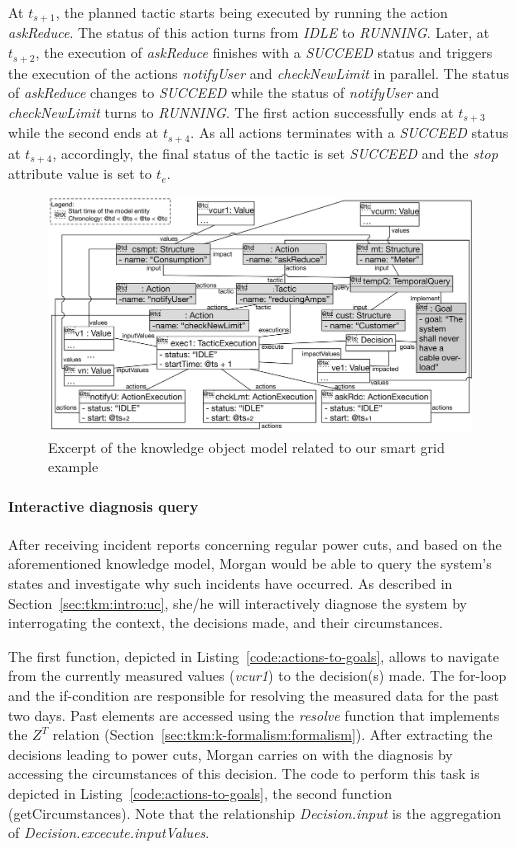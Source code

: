 At $t_{s+1}$, the planned tactic starts being executed by running the action \textit{askReduce}. The status of this action turns from \textit{IDLE} to \textit{RUNNING}. Later, at $t_{s+2}$, the execution of \textit{askReduce} finishes with a \textit{SUCCEED} status and triggers the execution of the actions \textit{notifyUser} and \textit{checkNewLimit} in parallel. The status of \textit{askReduce} changes to \textit{SUCCEED} while the status of \textit{notifyUser} and \textit{checkNewLimit} turns to \textit{RUNNING}.
The first action successfully ends at $t_{s+3}$ while the second ends at $t_{s+4}$. As all actions terminates with a \textit{SUCCEED} status at $t_{s+4}$, accordingly, the final status of the tactic is set \textit{SUCCEED} and the \textit{stop} attribute value is set to $t_{e}$.  

\begin{figure}
	\centering
	\includegraphics[width=\linewidth]{img/chapt-tkm/validation/action-om}
	\caption{Excerpt of the knowledge object model related to our smart grid example}
	\label{fig:tkm:valid:diag}
\end{figure}

\paragraph{Interactive diagnosis query}
After receiving incident reports concerning regular power cuts, and based on the aforementioned knowledge model, Morgan would be able to query the system's states and investigate why such incidents have occurred.
As described in Section~\ref{sec:tkm:intro:uc}, she/he will interactively diagnose the system by interrogating the context, the decisions made, and their circumstances.

The first function, depicted in Listing~\ref{code:actions-to-goals}, allows  to navigate from the currently measured values (\textit{vcur1}) to the decision(s) made. The for-loop and the if-condition are responsible for resolving the measured data for the past two days. 
Past elements are accessed using the \textit{resolve} function that implements the $Z^T$ relation (\cf Section~\ref{sec:tkm:k-formalism:formalism}).
After extracting the decisions leading to power cuts, Morgan carries on with the diagnosis by accessing the circumstances of this decision. The code to perform this task is depicted in Listing~\ref{code:actions-to-goals}, the second function (getCircumstances).
Note that the relationship \textit{Decision.input} is the aggregation of \textit{Decision.excecute.inputValues}.

